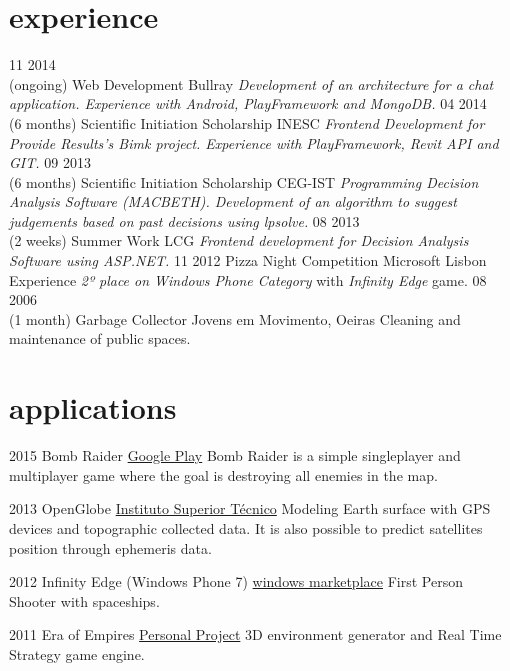 \documentclass[]{friggeri-cv}
\begin{document}
\section{experience}


\begin{entrylist}
  \entry
    {11 2014\\(ongoing)}
    {Web Development}
    {Bullray}
    {\emph{Development of an architecture for a chat application. Experience with Android, PlayFramework and MongoDB.}}
  \entry
    {04 2014\\(6 months)}
    {Scientific Initiation Scholarship}
    {INESC}
    {\emph{Frontend Development for Provide Results's Bimk project. Experience with PlayFramework, Revit API and GIT.}}
  \entry
    {09 2013\\(6 months)}
    {Scientific Initiation Scholarship}
    {CEG-IST}
    {\emph{Programming Decision Analysis Software (MACBETH). Development of an algorithm to suggest judgements based on past decisions using \emph{lpsolve}.}}
  \entry
    {08 2013\\(2 weeks)}
    {Summer Work}
    {LCG}
    {\emph{Frontend development for Decision Analysis Software using \emph{ASP.NET}. }}
  \entry
    {11 2012}
    {Pizza Night Competition}
    {Microsoft Lisbon Experience}
    {\emph{2º place on Windows Phone Category} with \emph{Infinity Edge} game.}
  \entry
    {08 2006\\(1 month)}
    {Garbage Collector}
    {Jovens em Movimento, Oeiras}
    {Cleaning and maintenance of public spaces.}


\end{entrylist}

\section{applications}

\begin{entrylist}
  \entry
    {2015}
    {Bomb Raider}
    {\href{http://play.google.com/store/apps/details?id=pt.ist.bombraider}{Google Play}}
    {Bomb Raider is a simple singleplayer and multiplayer game where the goal is destroying all enemies in the map.}

  \entry
    {2013}
    {OpenGlobe}
    {\href{http://web.ist.utl.pt/ist168621/?page=10}{Instituto Superior Técnico}}
    {Modeling Earth surface with GPS devices and topographic collected data. It is also possible to predict satellites position through ephemeris data.}

  \entry
    {2012}
    {Infinity Edge (Windows Phone 7)}
    {\href{http://www.windowsphone.com/en-us/store/app/infinity-edge/05516463-3a89-4351-996e-62e5b4519aeb}{windows marketplace}}
    {First Person Shooter with spaceships.}

  \entry
    {2011}
    {Era of Empires}
    {\href{http://web.ist.utl.pt/ist168621/?page=8}{Personal Project}}
    {3D environment generator and Real Time Strategy game engine.}


\end{entrylist}
\end{document}
